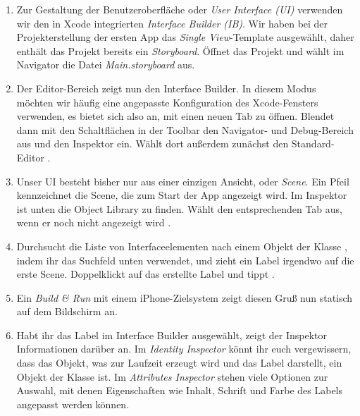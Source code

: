 \documentclass[parskip=half, final]{scrreprt}
\begin{document}
\begin{lecture}
\begin{enumerate}

\item Zur Gestaltung der Benutzeroberfläche oder \emph{User Interface (UI)} verwenden wir den in Xcode integrierten \emph{Interface Builder (IB)}. Wir haben bei der Projekterstellung der ersten App das \emph{Single View}-Template ausgewählt, daher enthält das Projekt bereits ein \emph{Storyboard}. Öffnet das Projekt und wählt im Navigator die Datei \emph{Main.storyboard} aus.

\item Der Editor-Bereich zeigt nun den Interface Builder. In diesem Modus möchten wir häufig eine angepasste Konfiguration des Xcode-Fensters verwenden, es bietet sich also an, mit  einen neuen Tab zu öffnen. Blendet dann mit den Schaltflächen in der Toolbar den Navigator- und Debug-Bereich aus und den Inspektor ein. Wählt dort außerdem zunächst den Standard-Editor .


\item Unser UI besteht bisher nur aus einer einzigen Ansicht, oder \emph{Scene}. Ein Pfeil kennzeichnet die Scene, die zum Start der App angezeigt wird. Im Inspektor ist unten die Object Library zu finden. Wählt den entsprechenden Tab aus, wenn er noch nicht angezeigt wird .

\item Durchsucht die Liste von Interfaceelementen nach einem Objekt der Klasse , indem ihr das Suchfeld unten verwendet, und zieht ein Label irgendwo auf die erste Scene. Doppelklickt auf das erstellte Label und tippt .

\item Ein \emph{Build \& Run} mit einem iPhone-Zielsystem zeigt diesen Gruß nun statisch auf dem Bildschirm an.

\item Habt ihr das Label im Interface Builder ausgewählt, zeigt der Inspektor Informationen darüber an. Im \emph{Identity Inspector} könnt ihr euch vergewissern, dass das Objekt, was zur Laufzeit erzeugt wird und das Label darstellt, ein Objekt der Klasse  ist. Im \emph{Attributes Inspector} stehen viele Optionen zur Auswahl, mit denen Eigenschaften wie Inhalt, Schrift und Farbe des Labels angepasst werden können.


\end{enumerate}
\end{lecture}
\end{document}
